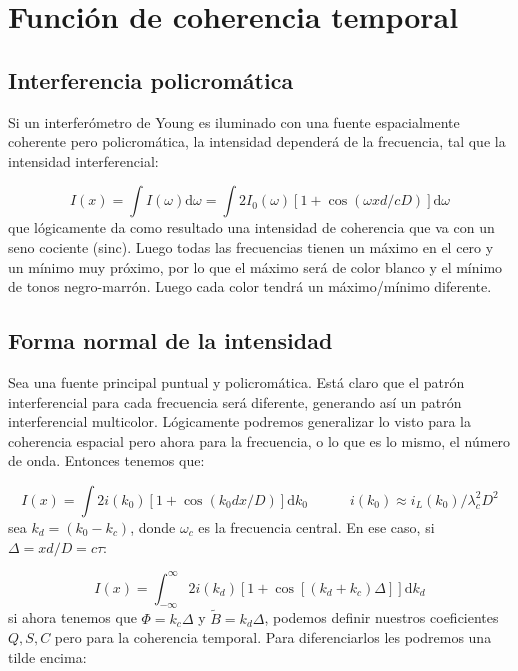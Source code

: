 \documentclass[12pt,a4paper]{book}
\numberwithin{equation}{section}
\numberwithin{figure}{section}
\newcommand{\tquad}{\quad \quad \quad}
\newcommand{\ccorchetes}[1]{\left[ #1  \right]}
\newcommand{\D}{\mathrm{d}}
\newcommand{\1}{_{(1)}}
\newcommand{\2}{_{(2)}}
\theoremstyle{definition}
\begin{document}
\section{Función de coherencia temporal}
\subsection{Interferencia policromática}

Si un interferómetro de Young es iluminado con una fuente espacialmente coherente pero policromática, la intensidad dependerá de la frecuencia, tal que la intensidad interferencial:

\begin{equation}
I(x) = \int I(\omega) \D \omega = \int 2 I_0 (\omega) \ccorchetes{1 + \cos (\omega x d / cD)}\D \omega
\end{equation}
que lógicamente da como resultado una intensidad de coherencia que va con un seno cociente (sinc). Luego todas las frecuencias tienen un máximo en el cero y un mínimo muy próximo, por lo que el máximo será de color blanco y el mínimo de tonos negro-marrón. Luego cada color tendrá un máximo/mínimo diferente. 

\subsection{Forma normal de la intensidad}

Sea una fuente principal puntual y policromática. Está claro que el patrón interferencial para cada frecuencia será diferente, generando así un patrón interferencial multicolor. Lógicamente podremos generalizar lo visto para la coherencia espacial pero ahora para la frecuencia, o lo que es lo mismo, el número de onda. Entonces tenemos que:

\begin{equation}
I(x) = \int 2 i(k_0) [1 + \cos (k_0 d x / D)] \D k_0 \tquad i(k_0) \approx i_L (k_0) / \lambda_c^2 D^2
\end{equation}
sea $k_d = (k_0 - k_c)$, donde $\omega_c$ es la frecuencia central. En ese caso, si $\Delta = xd /D = c \tau$:

\begin{equation}
I (x) = \int_{-\infty}^{\infty} 2 i (k_d) \ccorchetes{1+\cos[(k_d+k_c)\Delta]} \D k_d
\end{equation}
si ahora tenemos que $\Phi = k_c \Delta$ y $\tilde{B} = k_d \Delta$, podemos definir nuestros coeficientes $Q,S,C$ pero para la coherencia temporal. Para diferenciarlos les podremos una tilde encima:
\end{document}
